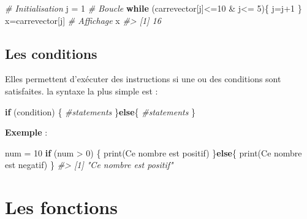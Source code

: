 \documentclass[
]{book}
\newenvironment{Shaded}{\begin{snugshade}}{\end{snugshade}}
\newcommand{\CommentTok}[1]{\textcolor[rgb]{0.56,0.35,0.01}{\textit{#1}}}
\newcommand{\ControlFlowTok}[1]{\textcolor[rgb]{0.13,0.29,0.53}{\textbf{#1}}}
\newcommand{\DecValTok}[1]{\textcolor[rgb]{0.00,0.00,0.81}{#1}}
\newcommand{\FunctionTok}[1]{\textcolor[rgb]{0.00,0.00,0.00}{#1}}
\newcommand{\NormalTok}[1]{#1}
\newcommand{\OtherTok}[1]{\textcolor[rgb]{0.56,0.35,0.01}{#1}}
\newcommand{\SpecialCharTok}[1]{\textcolor[rgb]{0.00,0.00,0.00}{#1}}
\newcommand{\StringTok}[1]{\textcolor[rgb]{0.31,0.60,0.02}{#1}}
\theoremstyle{definition}
\theoremstyle{definition}
\theoremstyle{definition}
\theoremstyle{definition}
\theoremstyle{remark}
\begin{document}
\begin{Shaded}
\begin{Highlighting}[]
\CommentTok{\# Initialisation}
\NormalTok{j }\OtherTok{=} \DecValTok{1}
\CommentTok{\# Boucle}
\ControlFlowTok{while}\NormalTok{ (carrevector[j]}\SpecialCharTok{\textless{}=}\DecValTok{10} \SpecialCharTok{\&}\NormalTok{ j}\SpecialCharTok{\textless{}=} \DecValTok{5}\NormalTok{)\{}
\NormalTok{  j}\OtherTok{=}\NormalTok{j}\SpecialCharTok{+}\DecValTok{1}
\NormalTok{\}}
\NormalTok{x}\OtherTok{=}\NormalTok{carrevector[j]}
\CommentTok{\# Affichage}
\NormalTok{x}
\CommentTok{\#\textgreater{} [1] 16}
\end{Highlighting}
\end{Shaded}

\hypertarget{les-conditions}{%
\subsection{Les conditions}\label{les-conditions}}

Elles permettent d'exécuter des instructions si une ou des conditions sont satisfaites. la syntaxe la plus simple est :

\begin{Shaded}
\begin{Highlighting}[]
\ControlFlowTok{if}\NormalTok{ (condition) \{}
  \CommentTok{\#statements}
\NormalTok{\}}\ControlFlowTok{else}\NormalTok{\{}
  \CommentTok{\#statements}
\NormalTok{\}}
\end{Highlighting}
\end{Shaded}

\textbf{Exemple} :

\begin{Shaded}
\begin{Highlighting}[]
\NormalTok{num }\OtherTok{=} \DecValTok{10}
\ControlFlowTok{if}\NormalTok{ (num }\SpecialCharTok{\textgreater{}} \DecValTok{0}\NormalTok{) \{}
  \FunctionTok{print}\NormalTok{(}\StringTok{\textquotesingle{}Ce nombre est positif\textquotesingle{}}\NormalTok{)}
\NormalTok{\}}\ControlFlowTok{else}\NormalTok{\{}
  \FunctionTok{print}\NormalTok{(}\StringTok{\textquotesingle{}Ce nombre est negatif\textquotesingle{}}\NormalTok{)}
\NormalTok{\}}
\CommentTok{\#\textgreater{} [1] "Ce nombre est positif"}
\end{Highlighting}
\end{Shaded}

\hypertarget{les-fonctions}{%
\section{Les fonctions}\label{les-fonctions}}
\end{document}
